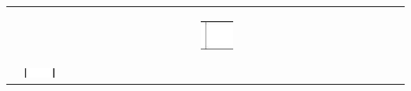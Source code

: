 \documentclass[10pt]{article}
\begin{document}
\begin{center}
\begin{tabular}{|c|c|c|c|c|c|c|c|c|c|c|c|c|c|c|c|c|c|c|c|c|c|c|c|c|c|c|c|c|c|}
\hline
 &  &  &  &  &  &  &  &  &  &  &  &  &  &  &  &  &  &  &  &  &  &  &  &  &  &  &  &  &  \\
\hline
 &  &  &  &  &  &  &  &  &  &  &  &  &  &  &  &  &  &  &  &  &  &  &  &  &  &  &  &  &  \\
\hline
 &  &  &  &  &  &  &  &  &  &  &  &  &  &  &  &  &  &  &  &  &  &  &  &  &  &  &  &  &  \\
\hline
 &  &  &  &  &  &  &  &  &  &  &  &  &  &  &  &  &  &  &  &  &  &  &  &  &  &  &  &  &  \\
\hline
 &  &  &  &  &  &  &  &  &  &  &  &  &  & \includegraphics[max width=\textwidth]{2024_11_21_1e89351873aa60c4c1b9g-18}
 &  &  &  &  &  &  &  &  &  &  &  &  &  &  &  \\
\hline
 &  &  &  &  &  &  &  &  &  &  &  &  &  &  &  &  &  &  &  &  &  &  &  &  &  &  &  &  &  \\
\hline
 &  &  &  &  &  &  &  &  &  &  &  &  &  &  &  &  &  &  &  &  &  &  &  &  &  &  &  &  &  \\
\hline
 & \includegraphics[max width=\textwidth]{2024_11_21_1e89351873aa60c4c1b9g-18(2)}

\end{tabular}
\end{center}
\end{document}
